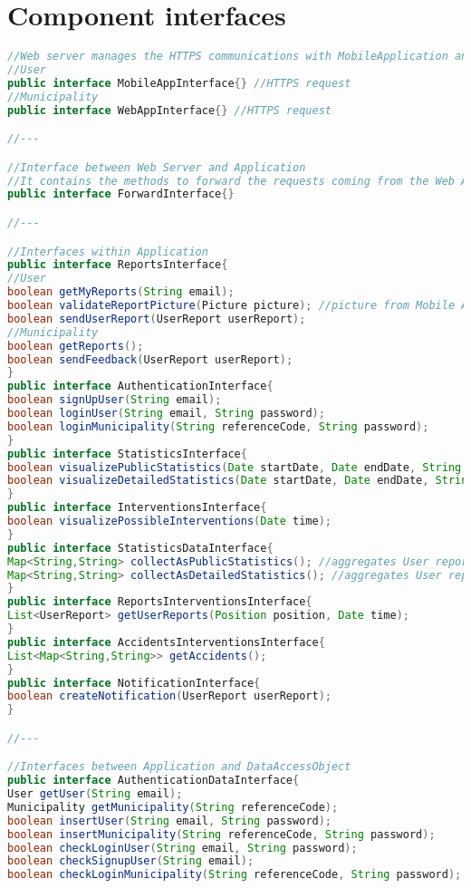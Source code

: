 \documentclass[../../DD.tex]{subfiles}
\begin{document}
\section{Component interfaces\label{sect:2.5}}

\begin{lstlisting}[language=Java]
//Web server manages the HTTPS communications with MobileApplication and Browser
//User
public interface MobileAppInterface{} //HTTPS request
//Municipality
public interface WebAppInterface{} //HTTPS request

//---

//Interface between Web Server and Application
//It contains the methods to forward the requests coming from the Web Application to the Router in the Application
public interface ForwardInterface{}

//---

//Interfaces within Application
public interface ReportsInterface{
//User
boolean getMyReports(String email);
boolean validateReportPicture(Picture picture); //picture from Mobile Application
boolean sendUserReport(UserReport userReport);
//Municipality
boolean getReports();
boolean sendFeedback(UserReport userReport);
}
public interface AuthenticationInterface{
boolean signUpUser(String email);
boolean loginUser(String email, String password);
boolean loginMunicipality(String referenceCode, String password);
}
public interface StatisticsInterface{
boolean visualizePublicStatistics(Date startDate, Date endDate, String typeOfViolation, Position position);
boolean visualizeDetailedStatistics(Date startDate, Date endDate, String typeOfViolation, Position position, String licensePlateNumber);
}
public interface InterventionsInterface{
boolean visualizePossibleInterventions(Date time);
}
public interface StatisticsDataInterface{
Map<String,String> collectAsPublicStatistics(); //aggregates User reports data
Map<String,String> collectAsDetailedStatistics(); //aggregates User reports data
}
public interface ReportsInterventionsInterface{
List<UserReport> getUserReports(Position position, Date time);
}
public interface AccidentsInterventionsInterface{
List<Map<String,String>> getAccidents();
}
public interface NotificationInterface{
boolean createNotification(UserReport userReport);
}

//---

//Interfaces between Application and DataAccessObject
public interface AuthenticationDataInterface{
User getUser(String email);
Municipality getMunicipality(String referenceCode);
boolean insertUser(String email, String password);
boolean insertMunicipality(String referenceCode, String password);
boolean checkLoginUser(String email, String password);
boolean checkSignupUser(String email);
boolean checkLoginMunicipality(String referenceCode, String password);


\end{lstlisting}
\end{document}

